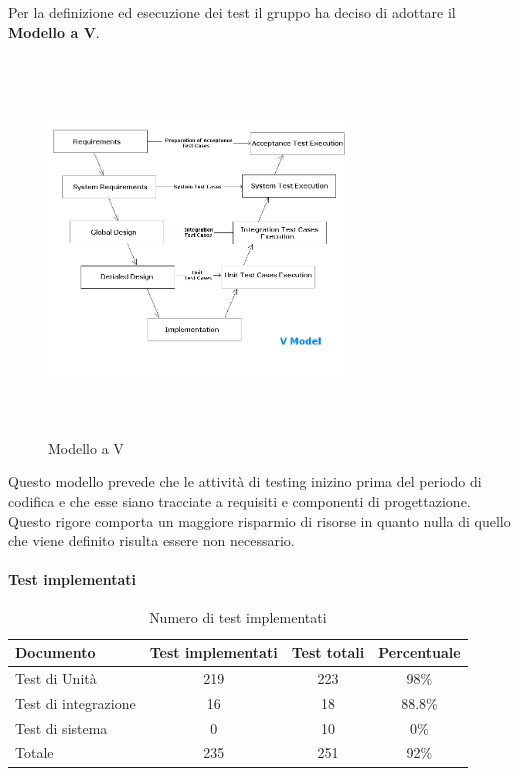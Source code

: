 \documentclass[PdQ.tex]{subfiles}
\begin{document}
\newpage
Per la definizione ed esecuzione dei test il gruppo ha deciso di adottare il \textbf{Modello a V}.

\begin{figure}[htbp]
	\centering
	\includegraphics[height=10cm,width=8cm]{v-model.png}
	\caption{Modello a V}
\end{figure}

Questo modello prevede che le attività di testing inizino prima del periodo di codifica e che esse siano tracciate a requisiti e componenti di progettazione.
Questo rigore comporta un maggiore risparmio di risorse in quanto nulla di quello che viene definito risulta essere non necessario.



	
	\paragraph{Test implementati}
	\begin{table}[h]
				\centering
				\begin{tabular}{l c c c}
					\hline
					\rule[-0.3cm]{0cm}{0.8cm}
					\textbf{Documento} & \textbf{Test implementati} & \textbf{Test totali} & \textbf{Percentuale}\\
					\hline
					\rule[0cm]{0cm}{0.4cm}
					Test di Unità & 219 & 223 & 98\% \\
					\rule[0cm]{0cm}{0.4cm}
					Test di integrazione & 16 & 18 & 88.8\% \\
					\rule[0cm]{0cm}{0.4cm}
					Test di sistema & 0 & 10 & 0\% \\
					\rule[0cm]{0cm}{0.4cm}
					Totale & 235 & 251 & 92\% \\
					\hline
				\end{tabular}
				\caption{Numero di test implementati}
			\end{table}
			\newpage
\end{document}
